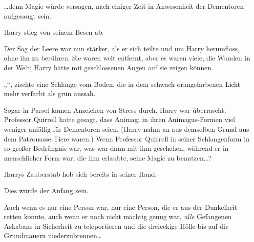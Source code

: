 …denn Magie würde versagen, nach einiger Zeit in Anwesenheit der Dementoren aufgesaugt sein.

Harry stieg von seinem Besen ab.

Der Sog der Leere war nun stärker, als er sich teilte und um Harry herumfloss, ohne ihn zu berühren. Sie waren weit entfernt, aber es waren viele, die Wunden in der Welt; Harry hätte mit geschlossenen Augen auf sie zeigen können.

„“, zischte eine Schlange vom Boden, die in dem schwach orangefarbenen Licht mehr verfärbt als grün aussah.

Sogar in Parsel kamen Anzeichen von Stress durch. Harry war überrascht; Professor Quirrell hatte gesagt, dass Animagi in ihren Animagus-Formen viel weniger anfällig für Dementoren seien. (Harry nahm an aus demselben Grund aus dem Patronusse Tiere waren.) Wenn Professor Quirrell in seiner Schlangenform in so großer Bedrängnis war, was war dann mit ihm geschehen, während er in menschlicher Form war, die ihm erlaubte, seine Magie zu benutzen…?

Harrys Zauberstab hob sich bereits in seiner Hand.

Dies würde der Anfang sein.

Auch wenn es nur eine Person war, nur eine Person, die er aus der Dunkelheit retten konnte, auch wenn er noch nicht mächtig genug war, \emph{alle} Gefangenen Askabans in Sicherheit zu teleportieren und die dreieckige Hölle bis auf die Grundmauern niederzubrennen…

